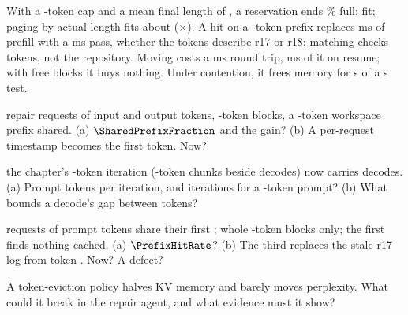 \documentclass{studysheet}
\begin{document}
\begin{rightcol}
%
  {With a -token cap and a mean final length of , a reservation ends
   \% full:  fit; paging by actual length fits about 
   ($\times$).}{}
%
  {A hit on a -token prefix replaces  ms of prefill with a  ms
   pass, whether the tokens describe r17 or r18: matching checks tokens, not the repository.}{}
%
  {Moving costs a  ms round trip,  ms of it on resume; with free blocks it
   buys nothing. Under contention, it frees memory for  s of a  s test.}{}

\vspace{2pt}
\begin{qs}
\item \assumed{} repair requests of  input and  output tokens, -token
  blocks, a -token workspace prefix shared. (a) $\SharedPrefixFraction$ and the gain?
  (b) A per-request timestamp becomes the first token. Now?
\item \assumed{} the chapter's -token iteration (-token chunks beside 
  decodes) now carries  decodes. (a) Prompt tokens per iteration, and iterations for a
  -token prompt? (b) What bounds a decode's gap between tokens?
\item \assumed{}  requests of  prompt tokens share their first ; whole
  -token blocks only; the first finds nothing cached. (a) $\PrefixHitRate$? (b) The third replaces
  the stale r17 log from token . Now? A defect?
\item A token-eviction policy halves KV memory and barely moves perplexity. What could it break in
  the repair agent, and what evidence must it show?
\end{qs}
\end{rightcol}
\end{document}
